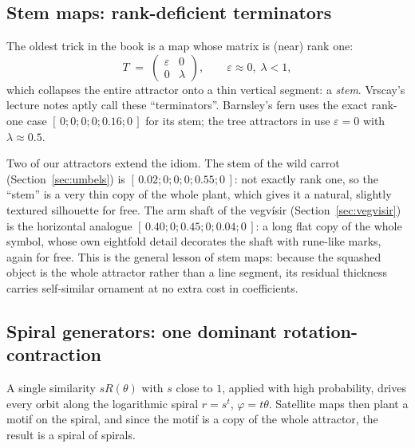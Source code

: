 \documentclass[11pt,a4paper]{article}
\theoremstyle{remark}
\begin{document}
\subsection{Stem maps: rank-deficient terminators}
\label{sec:stems}

The oldest trick in the book is a map whose matrix is (near) rank one:
\[
T \;=\;
\begin{pmatrix} \varepsilon & 0 \\ 0 & \lambda \end{pmatrix},
\qquad \varepsilon \approx 0,\; \lambda < 1,
\]
which collapses the entire attractor onto a thin vertical segment: a
\emph{stem}. Vrscay's lecture notes \cite{vrscay} aptly call these
``terminators''. Barnsley's fern uses the exact rank-one case
$[\,0;0;0;0;0.16;0\,]$ for its stem; the tree attractors in
\cite{vrscay} use $\varepsilon = 0$ with $\lambda \approx 0.5$.

Two of our attractors extend the idiom. The stem of the wild carrot
(Section~\ref{sec:umbels}) is $[\,0.02; 0; 0; 0; 0.55; 0\,]$: not exactly
rank one, so the ``stem'' is a very thin copy of the whole plant, which
gives it a natural, slightly textured silhouette for free. The arm shaft of
the vegvísir (Section~\ref{sec:vegvisir}) is the horizontal analogue
$[\,0.40; 0; 0.45; 0; 0.04; 0\,]$: a long flat copy of the whole symbol,
whose own eightfold detail decorates the shaft with rune-like marks, again
for free. This is the general lesson of stem maps: because the squashed
object is the whole attractor rather than a line segment, its residual
thickness carries self-similar ornament at no extra cost in coefficients.

\subsection{Spiral generators: one dominant rotation-contraction}
\label{sec:spirals}

A single similarity $sR(\theta)$ with $s$ close to $1$, applied with high
probability, drives every orbit along the logarithmic spiral $r = s^{t}$,
$\varphi = t\theta$. Satellite maps then plant a motif on the spiral, and
since the motif is a copy of the whole attractor, the result is a spiral of
spirals.
\end{document}
